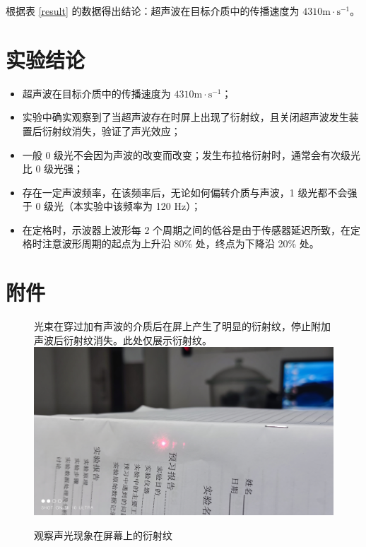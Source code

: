 \documentclass[12pt]{ctexart}
\begin{document}
    根据表 \ref{result} 的数据得出结论：超声波在目标介质中的传播速度为 $4310 \mathrm{m} \cdot \mathrm{s}^{-1}$。

    \section{实验结论}

    \begin{itemize}
        \item 超声波在目标介质中的传播速度为 $4310 \mathrm{m} \cdot \mathrm{s}^{-1}$；
        \item 实验中确实观察到了当超声波存在时屏上出现了衍射纹，且关闭超声波发生装置后衍射纹消失，验证了声光效应；
        \item 一般 0 级光不会因为声波的改变而改变；发生布拉格衍射时，通常会有次级光比 0 级光强；
        \item 存在一定声波频率，在该频率后，无论如何偏转介质与声波，1 级光都不会强于 0 级光（本实验中该频率为 120 Hz）；
        \item 在定格时，示波器上波形每 2 个周期之间的低谷是由于传感器延迟所致，在定格时注意波形周期的起点为上升沿 80\% 处，终点为下降沿 20\% 处。
    \end{itemize}

    \section{附件}

    \begin{figure}[hp]
        \centering
        \caption{观察声光现象在屏幕上的衍射纹}
        \label{sp02}
        {\small 光束在穿过加有声波的介质后在屏上产生了明显的衍射纹，停止附加声波后衍射纹消失。此处仅展示衍射纹。}
        \includegraphics[scale=0.1]{pics/sp02.jpg}
    \end{figure}
\end{document}
